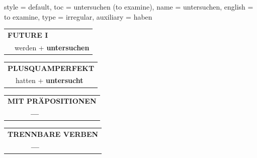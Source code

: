 \begin{verbentry}{
  style = {default},
  toc = {untersuchen (to examine)},
  name = {untersuchen},
  english = {to examine},
  type = {irregular},
  auxiliary = {haben}
}
\begin{tabular}{rl}
    \multicolumn{2}{l}{\textbf{FUTURE I} }\\
   & werden + \textbf{untersuchen}\\
 
  \end{tabular}
\hfill
   \begin{tabular}{rl}
      \multicolumn{2}{l}{\textbf{PLUSQUAMPERFEKT}}\\
   & hatten + \textbf{untersucht}\\
  \end{tabular}
  
  \vspace{10pt}



\begin{tabular}{lll}
\multicolumn{3}{l}{\textbf{MIT PRÄPOSITIONEN}}\\
& \textbf{---} & \\
\end{tabular}
\hfill
\begin{tabular}{lll}
\multicolumn{3}{l}{\textbf{TRENNBARE VERBEN}}\\
& \textbf{---} & \\
\end{tabular}

  \vspace{-5pt}
\end{verbentry}
